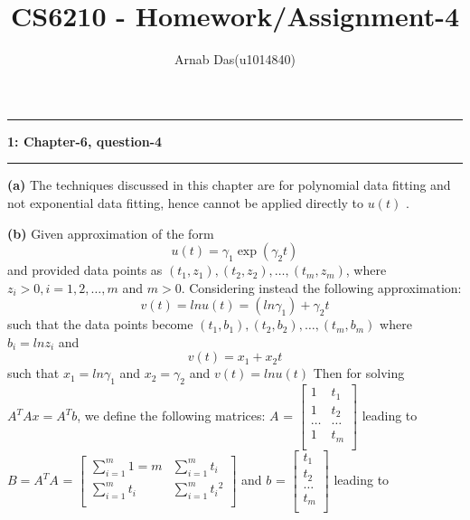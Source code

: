 \documentclass{article}
\title{CS6210 - Homework/Assignment-4}
\author{Arnab Das(u1014840)}
\newcommand\question[2]{\vspace{.25in}\hrule\textbf{#1: #2}\hrule\vspace{.10in}}
\renewcommand\part[1]{\vspace{.10in}\textbf{(#1)}}
\begin{document}
  \maketitle
  \newpage
  \newcommand\NAME{ARNAB DAS}
  \newcommand\UID{uxxxxxxx}
  \newcommand\HWNUM{4}

  \question{1}{Chapter-6, question-4} 
  \part{a} The techniques discussed in this chapter are for polynomial data fitting and not exponential data fitting, hence cannot be applied directly to $u(t)$ . \newline
  
  \part{b} Given approximation of the form
  \[ u(t) = \gamma_1 \exp(\gamma_2t)\]
  and provided data points as $(t_1,z_1),(t_2,z_2), \dots , (t_m,z_m)$, where $z_i > 0, i=1,2,\dots,m$ and $m>0$. \newline
  Considering instead the following approximation: \newline
  \[ v(t) = lnu(t) = (ln\gamma_1) + \gamma_2t \]
  such that the data points become $(t_1,b_1),(t_2,b_2), \dots , (t_m,b_m)$ where $b_i = lnz_i$ and 
  \[v(t) = x_1 + x_2t\]
  such that $x_1 = ln\gamma_1$ and $x_2 = \gamma_2$ and $v(t) = lnu(t)$ \newline
  Then for solving $A^TAx = A^Tb$, we define the following matrices: \newline
  $A$ = $\begin{bmatrix}
	  1 & t_1 \\
	  1 & t_2 \\
	  \dots & \dots \\
	  1 & t_m \\
\end{bmatrix}$ leading to 
 $B = A^TA$ =  $\begin{bmatrix}
	 \sum_{i=1}^m 1 = m & \sum_{i=1}^m t_i \\
	 \sum_{i=1}^m t_i & \sum_{i=1}^m {t_{i}}^2 \\ 	 
 \end{bmatrix}$ and
 $b$ = $\begin{bmatrix}
	 t_1 \\
	 t_2 \\
	 \dots \\
	 t_m \\
\end{bmatrix}$ leading to 
\end{document}
